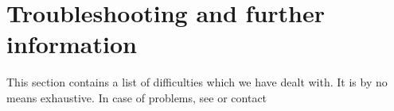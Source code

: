 \documentclass[12pt,twoside]{article}
\begin{document}
\section{Troubleshooting and further information}
\label{sec:troubleshoot}
This section contains a list of difficulties which we have dealt
with. It is by no means exhaustive. 
In case of problems, see \htmladdnormallink{\tt
\healpixsupport}{\healpixsupport} or contact \healpixmail
\end{document}
